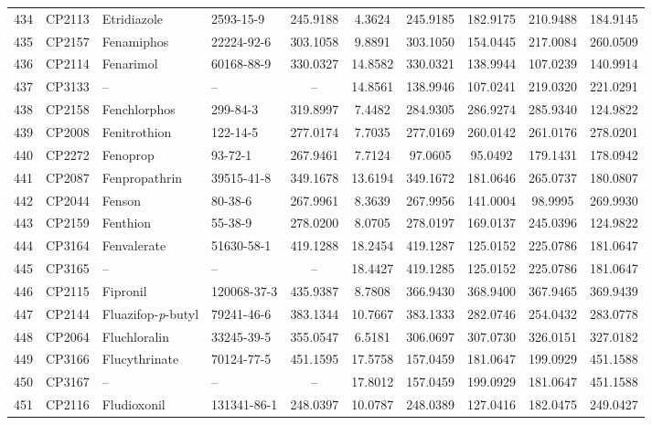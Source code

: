\begin{longtable}{clllcccccc}
434 & CP2113 & Etridiazole & 2593-15-9 & 245.9188 & 4.3624 & 245.9185 & 182.9175 & 210.9488 & 184.9145 \\ 
435 & CP2157 & Fenamiphos & 22224-92-6 & 303.1058 & 9.8891 & 303.1050 & 154.0445 & 217.0084 & 260.0509 \\ 
436 & CP2114 & Fenarimol & 60168-88-9 & 330.0327 & 14.8582 & 330.0321 & 138.9944 & 107.0239 & 140.9914 \\ 
437 & CP3133 & – & – & – & 14.8561 & 138.9946 & 107.0241 & 219.0320 & 221.0291 \\ 
438 & CP2158 & Fenchlorphos & 299-84-3 & 319.8997 & 7.4482 & 284.9305 & 286.9274 & 285.9340 & 124.9822 \\ 
439 & CP2008 & Fenitrothion & 122-14-5 & 277.0174 & 7.7035 & 277.0169 & 260.0142 & 261.0176 & 278.0201 \\ 
440 & CP2272 & Fenoprop & 93-72-1 & 267.9461 & 7.7124 & 97.0605 & 95.0492 & 179.1431 & 178.0942 \\ 
441 & CP2087 & Fenpropathrin & 39515-41-8 & 349.1678 & 13.6194 & 349.1672 & 181.0646 & 265.0737 & 180.0807 \\ 
442 & CP2044 & Fenson & 80-38-6 & 267.9961 & 8.3639 & 267.9956 & 141.0004 & 98.9995 & 269.9930 \\ 
443 & CP2159 & Fenthion & 55-38-9 & 278.0200 & 8.0705 & 278.0197 & 169.0137 & 245.0396 & 124.9822 \\ 
444 & CP3164 & Fenvalerate & 51630-58-1 & 419.1288 & 18.2454 & 419.1287 & 125.0152 & 225.0786 & 181.0647 \\ 
445 & CP3165 & – & – & – & 18.4427 & 419.1285 & 125.0152 & 225.0786 & 181.0647 \\ 
446 & CP2115 & Fipronil & 120068-37-3 & 435.9387 & 8.7808 & 366.9430 & 368.9400 & 367.9465 & 369.9439 \\ 
447 & CP2144 & Fluazifop-\textit{p}-butyl & 79241-46-6 & 383.1344 & 10.7667 & 383.1333 & 282.0746 & 254.0432 & 283.0778 \\ 
448 & CP2064 & Fluchloralin & 33245-39-5 & 355.0547 & 6.5181 & 306.0697 & 307.0730 & 326.0151 & 327.0182 \\ 
449 & CP3166 & Flucythrinate\smash{\textsuperscript{\textdaggerdbl}} & 70124-77-5 & 451.1595 & 17.5758 & 157.0459 & 181.0647 & 199.0929 & 451.1588 \\ 
450 & CP3167 & – & – & – & 17.8012 & 157.0459 & 199.0929 & 181.0647 & 451.1588 \\ 
451 & CP2116 & Fludioxonil & 131341-86-1 & 248.0397 & 10.0787 & 248.0389 & 127.0416 & 182.0475 & 249.0427 \\ 

\end{longtable}
